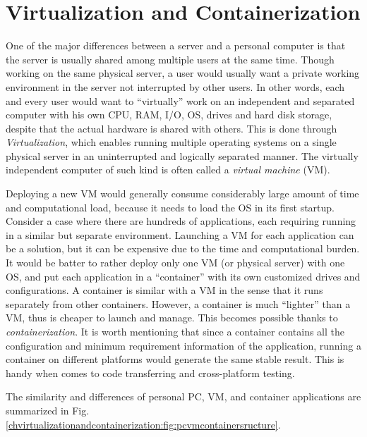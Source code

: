 \chapter{Virtualization and Containerization}

One of the major differences between a server and a personal computer is that the server is usually shared among multiple users at the same time. Though working on the same physical server, a user would usually want a private working environment in the server not interrupted by other users. In other words, each and every user would want to ``virtually'' work on an independent and separated computer with his own CPU, RAM, I/O, OS, drives and hard disk storage, despite that the actual hardware is shared with others. This is done through \textit{Virtualization}, which enables running multiple operating systems on a single physical server in an uninterrupted and logically separated manner. The virtually independent computer of such kind is often called a \textit{virtual machine} (VM).

Deploying a new VM would generally consume considerably large amount of time and computational load, because it needs to load the OS in its first startup. Consider a case where there are hundreds of applications, each requiring running in a similar but separate environment. Launching a VM for each application can be a solution, but it can be expensive due to the time and computational burden. It would be batter to rather deploy only one VM (or physical server) with one OS, and put each application in a ``container'' with its own customized drives and configurations. A container is similar with a VM in the sense that it runs separately from other containers. However, a container is much ``lighter'' than a VM, thus is cheaper to launch and manage. This becomes possible thanks to \textit{containerization}. It is worth mentioning that since a container contains all the configuration and minimum requirement information of the application, running a container on different platforms would generate the same stable result. This is handy when comes to code transferring and cross-platform testing.

The similarity and differences of personal PC, VM, and container applications are summarized in Fig. \ref{chvirtualizationandcontainerization:fig:pcvmcontainersructure}.

